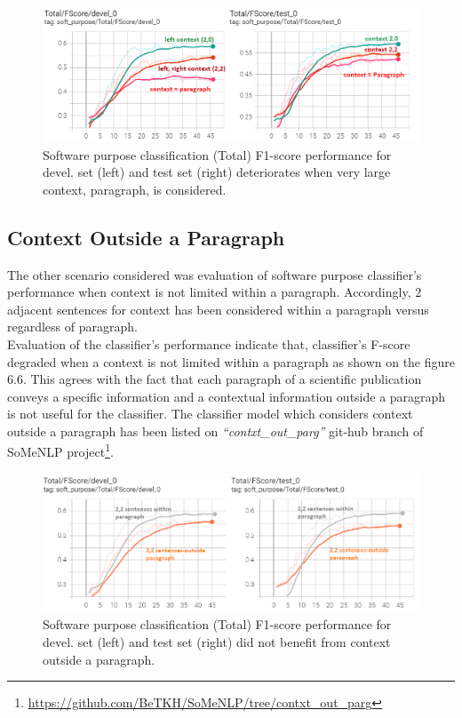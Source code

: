 \begin{figure}[htbp]
	\centering
	\includegraphics[width=.80\textwidth]{4.graphics/figures/ch_6/2.left_context_vs_right/HD/context_paragrapgh}
	\caption{Software purpose classification (Total) F1-score performance for devel. set (left) and test set (right) deteriorates when very large context, paragraph, is considered.}
	\label{fig:chapter06:with}
\end{figure}


\subsection{Context Outside a Paragraph}
\label{sec:chapter06:contxtOutside}


The other scenario considered was evaluation of software purpose classifier's performance when context is not limited within a paragraph. Accordingly, 2 adjacent sentences for context has been considered within a paragraph versus regardless of paragraph. \\

Evaluation of the classifier's performance indicate that, classifier’s F-score degraded when a context is not limited within a paragraph as shown on the figure 6.6. This agrees with the fact that each paragraph of a scientific publication conveys a specific information and a contextual information outside a paragraph is not useful for the classifier.  The classifier model which considers context outside a paragraph has been listed on \emph{“contxt\_out\_parg”} git-hub branch of SoMeNLP project\footnote{\url{https://github.com/BeTKH/SoMeNLP/tree/contxt_out_parg}}. \\

\begin{figure}[htbp]
	\centering
	\includegraphics[width=.80\textwidth]{4.graphics/figures/ch_6/2.left_context_vs_right/HD/Fscore_outside_paragrapgh_vs_inside}
	\caption{Software purpose classification (Total) F1-score performance for devel. set (left) and test set (right) did not benefit from context outside a paragraph. }
	\label{fig:chapter06:with}
\end{figure}


